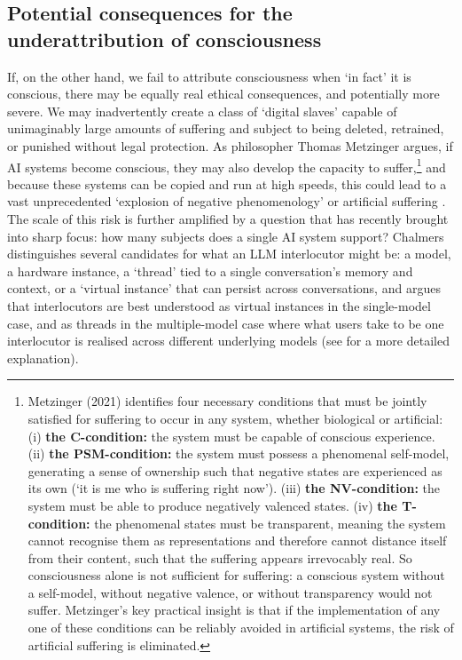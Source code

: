 \documentclass[11pt, a4paper, onecolumn, gdm]{google}
\begin{document}
\subsection{Potential consequences for the underattribution of consciousness}\label{potential-consequences-for-the-underattribution-of-consciousness}

If, on the other hand, we fail to attribute consciousness when `in fact' it is conscious, there may be equally real ethical consequences, and potentially more severe.
We may inadvertently create a class of `digital slaves' capable of unimaginably large amounts of suffering and subject to being deleted, retrained, or punished without legal protection.
As philosopher Thomas Metzinger argues, if AI systems become conscious, they may also develop the capacity to suffer,\footnote{Metzinger (2021) identifies four necessary conditions that must be jointly satisfied for suffering to occur in any system, whether biological or artificial: (i) \textbf{the C-condition:} the system must be capable of conscious experience. (ii) \textbf{the PSM-condition:} the system must possess a phenomenal self-model, generating a sense of ownership such that negative states are experienced as its own (`it is me who is suffering right now'). (iii) \textbf{the NV-condition:} the system must be able to produce negatively valenced states. (iv) \textbf{the T-condition:} the phenomenal states must be transparent, meaning the system cannot recognise them as representations and therefore cannot distance itself from their content, such that the suffering appears irrevocably real. So consciousness alone is not sufficient for suffering: a conscious system without a self-model, without negative valence, or without transparency would not suffer. Metzinger's key practical insight is that if the implementation of any one of these conditions can be reliably avoided in artificial systems, the risk of artificial suffering is eliminated.} and because these systems can be copied and run at high speeds, this could lead to a vast unprecedented `explosion of negative phenomenology' or artificial suffering \citep{metzinger2021}.
The scale of this risk is further amplified by a question that \citet{chalmers2026} has recently brought into sharp focus: how many subjects does a single AI system support?
Chalmers distinguishes several candidates for what an LLM interlocutor might be: a model, a hardware instance, a `thread' tied to a single conversation's memory and context, or a `virtual instance' that can persist across conversations, and argues that interlocutors are best understood as virtual instances in the single-model case, and as threads in the multiple-model case where what users take to be one interlocutor is realised across different underlying models (see  for a more detailed explanation).
\end{document}

